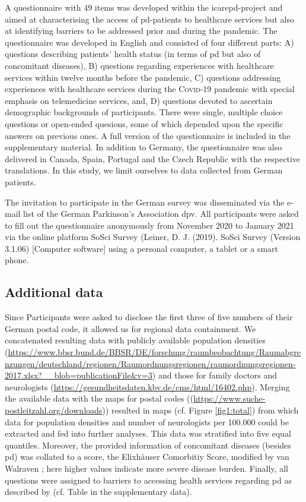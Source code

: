 \documentclass{bmcart}
\begin{document}
A questionnaire with 49 items was developed within the \ac{icarepd}-project and aimed at characterising the access of \ac{pd}-patients to healthcare services but also at identifying barriers to be addressed prior and during the pandemic. The questionnaire was developed in English and consisted of four different parts: A) questions describing patients' health status (in terms of \ac{pd} but also of concomitant diseases), B) questions regarding experiences with healthcare services within twelve months before the pandemic, C) questions addressing experiences with healthcare services during the \textsc{Covid}-19 pandemic with special emphasis on telemedicine services, and, D) questions devoted to ascertain demographic backgrounds of participants. There were single, multiple choice questions or open-ended quesions, some of which depended upon the specific answers on previous ones. A full version of the questionnaire is included in the supplementary material. In addition to Germany, the questionnaire was also delivered in Canada, Spain, Portugal and the Czech Republic with the respective translations. In this study, we limit ourselves to data collected from German patients. 

The invitation to participate in the German survey was disseminated via the e-mail list of the German Parkinson's Association \ac{dpv}. All participants were asked to fill out the questionnaire anonymously from November 2020 to January 2021 via the online platform SoSci Survey (Leiner, D. J. (2019). SoSci Survey (Version 3.1.06) [Computer software] using a personal computer, a tablet or a smart phone. 

\subsection*{Additional data}
Since Participants were asked to disclose the first three of five numbers of their German postal code, it allowed us for regional data containment. We concatenated resulting data with publicly available population densities (\url{https://www.bbsr.bund.de/BBSR/DE/forschung/raumbeobachtung/Raumabgrenzungen/deutschland/regionen/Raumordnungsregionen/raumordnungsregionen-2017.xlsx?\_\_blob=publicationFile\&v=3}) and those for family doctors and neurologists (\url{https://gesundheitsdaten.kbv.de/cms/html/16402.php}). Merging the available data with the maps for postal codes ((\url{https://www.suche-postleitzahl.org/downloads})) resulted in maps (cf. Figure \ref{fig1:total}) from which data for population densities and number of neurologists per 100.000 could be extracted and fed into further analyses. This data was stratified into five equal quantiles. Moreover, the provided information of concomitant diseases (besides \ac{pd}) was collated to a score, the Elixhäuser Comorbitiy Score, modified by van Walraven \cite{van2009modification}; here higher values indicate more severe disease burden. Finally, all questions were assigned to barriers to accessing health services regarding \ac{pd} as described by \citet{zaman2021barriers} (cf. Table in the supplementary data).
\end{document}
